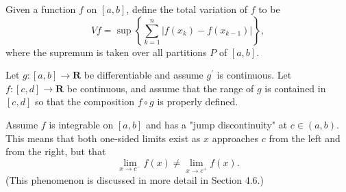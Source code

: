\begin{exercise}
Given a function $f$ on $[a, b]$, define the total variation of $f$ to be
$$
V f=\sup \left\{\sum_{k=1}^{n}\left|f\left(x_{k}\right)-f\left(x_{k-1}\right)\right|\right\},
$$
where the supremum is taken over all partitions $P$ of $[a, b]$.
\end{exercise}
\begin{solution}
    \TODO
\end{solution}

\begin{exercise} Let $g:[a, b] \rightarrow \mathbf{R}$ be differentiable and assume $g^{\prime}$ is continuous. Let $f:[c, d] \rightarrow \mathbf{R}$ be continuous, and assume that the range of $g$ is contained in $[c, d]$ so that the composition $f \circ g$ is properly defined.
\end{exercise}
\begin{solution}
    \TODO
\end{solution}

\begin{exercise} Assume $f$ is integrable on $[a, b]$ and has a "jump discontinuity" at $c \in(a, b)$. This means that both one-sided limits exist as $x$ approaches $c$ from the left and from the right, but that
$$
\lim _{x \rightarrow c^{-}} f(x) \neq \lim _{x \rightarrow c^{+}} f(x) .
$$
(This phenomenon is discussed in more detail in Section 4.6.)
\end{exercise}
\begin{solution}
    \TODO
\end{solution}
